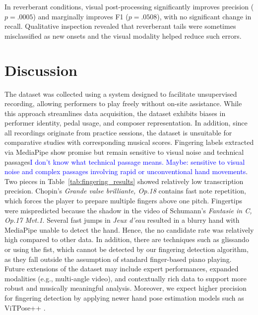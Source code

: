 \documentclass{article}
\newcommand{\alex}[1]{\textcolor{blue}{#1}}%
\begin{document}
In reverberant conditions, visual post-processing significantly improves precision ($p = .0005$) and marginally improves F1 ($p = .0508$), with no significant change in recall. Qualitative inspection revealed that reverberant tails were sometimes misclassified as new onsets and the visual modality helped reduce such errors.

 
\section{Discussion}\label{sec:discussion}
The dataset was collected using a system designed to facilitate unsupervised recording, allowing performers to play freely without on-site assistance. While this approach streamlines data acquisition, the dataset exhibits biases in performer identity, pedal usage, and composer representation. In addition, since all recordings originate from practice sessions, the dataset is unsuitable for comparative studies with corresponding musical scores. 
Fingering labels extracted via MediaPipe show promise but remain sensitive to visual noise and technical passages\alex{I don't know what technical passage means. Maybe: sensitive to visual noise and complex passages involving rapid or unconventional hand movements}. Two pieces in Table~\ref{tab:fingering_results} showed relatively low transcription precision. Chopin's \textit{Grande valse brilliante, Op.18} contains fast note repetition, which forces the player to prepare multiple fingers above one pitch. Fingertips were mispredicted because the shadow in the video of Schumann's \textit{Fantasie in C, Op.17 Mvt.1}. Several fast jumps in \textit{Jeux d'eau} resulted in a blurry  hand with MediaPipe unable to detect the hand. Hence, the no candidate rate was relatively high compared to other data. In addition, there are techniques such as glissando or using the fist, which cannot be detected by our fingering detection algorithm, as they fall outside the assumption of standard finger-based piano playing.\\
Future extensions of the dataset may include expert performances, expanded modalities (e.g., multi-angle video), and contextually rich data to support more robust and musically meaningful analysis. Moreover, we expect higher precision for fingering detection by applying newer hand pose estimation models such as ViTPose++ \cite{ViTPose++}.
 
\end{document}

